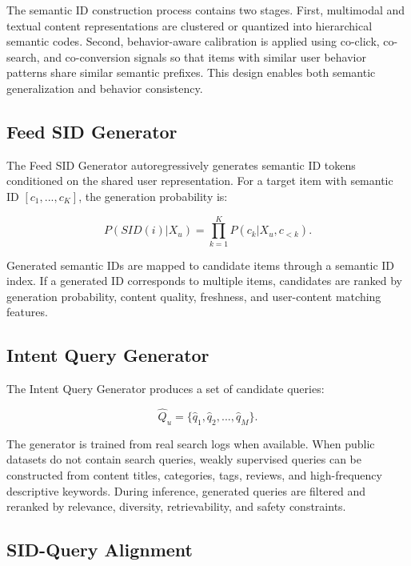 \documentclass[11pt]{article}
\begin{document}
The semantic ID construction process contains two stages. First, multimodal and textual content representations are clustered or quantized into hierarchical semantic codes. Second, behavior-aware calibration is applied using co-click, co-search, and co-conversion signals so that items with similar user behavior patterns share similar semantic prefixes. This design enables both semantic generalization and behavior consistency.

\subsection{Feed SID Generator}

The Feed SID Generator autoregressively generates semantic ID tokens conditioned on the shared user representation. For a target item with semantic ID $[c_1, ..., c_K]$, the generation probability is:

\begin{equation}
P(SID(i)|X_u) = \prod_{k=1}^{K} P(c_k | X_u, c_{<k}).
\end{equation}

Generated semantic IDs are mapped to candidate items through a semantic ID index. If a generated ID corresponds to multiple items, candidates are ranked by generation probability, content quality, freshness, and user-content matching features.

\subsection{Intent Query Generator}

The Intent Query Generator produces a set of candidate queries:

\begin{equation}
\hat{Q}_u = \{\hat{q}_1, \hat{q}_2, ..., \hat{q}_M\}.
\end{equation}

The generator is trained from real search logs when available. When public datasets do not contain search queries, weakly supervised queries can be constructed from content titles, categories, tags, reviews, and high-frequency descriptive keywords. During inference, generated queries are filtered and reranked by relevance, diversity, retrievability, and safety constraints.

\subsection{SID-Query Alignment}
\end{document}
